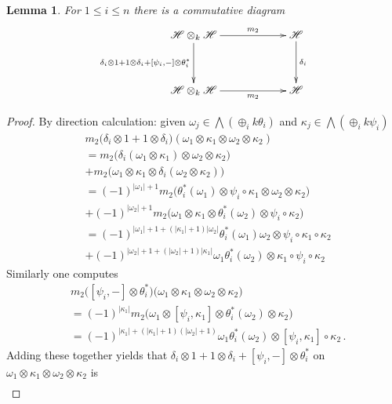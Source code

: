 \documentclass[english,letter paper,12pt,leqno]{article}
\newtheorem{lemma}[theorem]{Lemma}
\theoremstyle{example}
\numberwithin{equation}{section}
\def\be{\begin{equation}}
\def\ee{\end{equation}}
\begin{document}
\begin{lemma}\label{lemma:stratos} For $1 \le i \le n$ there is a commutative diagram
\be
\xymatrix@C+3pc@R+1pc{
\mathscr{H} \otimes_k \mathscr{H} \ar[d]_-{\delta_i \otimes 1 + 1 \otimes \delta_i + [\psi_i,-] \otimes \theta_i^*} \ar[r]^-{m_2} & \mathscr{H} \ar[d]^-{\delta_i}\\
\mathscr{H} \otimes_k \mathscr{H} \ar[r]_-{m_2} & \mathscr{H}
}
\ee
\end{lemma}
\begin{proof}
By direction calculation: given $\omega_j \in \bigwedge( \oplus_i k \theta_i )$ and $\kappa_j \in \bigwedge( \oplus_i k \psi_i )$
\begin{align*}
&m_2\big( \delta_i \otimes 1 + 1 \otimes \delta_i \big)( \omega_1 \otimes \kappa_1 \otimes \omega_2 \otimes \kappa_2 )\\
&= m_2\big( \delta_i( \omega_1 \otimes \kappa_1 ) \otimes \omega_2 \otimes \kappa_2 \big)\\
&+ m_2\big( \omega_1 \otimes \kappa_1 \otimes \delta_i( \omega_2 \otimes \kappa_2 ) \big)\\
&= (-1)^{|\omega_1| + 1}m_2\big( \theta_i^*(\omega_1) \otimes \psi_i \circ \kappa_1 \otimes \omega_2 \otimes \kappa_2 )\\
&+ (-1)^{|\omega_2| + 1}m_2\big( \omega_1 \otimes \kappa_1 \otimes \theta_i^*(\omega_2) \otimes \psi_i \circ \kappa_2 \big)\\
&= (-1)^{|\omega_1|+1+(|\kappa_1|+1)|\omega_2|} \theta_i^*(\omega_1) \omega_2 \otimes \psi_i \circ \kappa_1 \circ \kappa_2\\
&+ (-1)^{|\omega_2|+1+(|\omega_2|+1)|\kappa_1|} \omega_1 \theta_i^*(\omega_2) \otimes \kappa_1 \circ \psi_i \circ \kappa_2
\end{align*}
Similarly one computes
\begin{align*}
&m_2 \big( [\psi_i,-] \otimes \theta_i^* \big)( \omega_1 \otimes \kappa_1 \otimes \omega_2 \otimes \kappa_2 \big)\\
&= (-1)^{|\kappa_1|} m_2 \big( \omega_1 \otimes [\psi_i, \kappa_1] \otimes \theta_i^*(\omega_2) \otimes \kappa_2 \big)\\
&= (-1)^{|\kappa_1|+(|\kappa_1|+1)(|\omega_2|+1)} \omega_1 \theta_i^*(\omega_2) \otimes [\psi_i, \kappa_1] \circ \kappa_2\,.
\end{align*}
Adding these together yields that $\delta_i \otimes 1 + 1 \otimes \delta_i + [\psi_i,-] \otimes \theta_i^*$ on $\omega_1 \otimes \kappa_1 \otimes \omega_2 \otimes \kappa_2$ is
\begin{align*}

\end{align*}
\end{proof}
\end{document}
